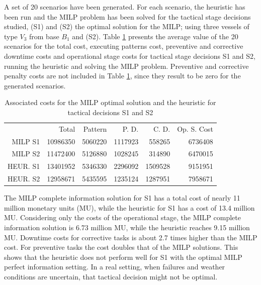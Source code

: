 A set of 20 scenarios have been generated. For each scenario, the heuristic has been run and the MILP problem has been solved for the tactical stage decisions studied, (S1) and (S2) the optimal solution for the MILP; using three vessels of type $V_3$ from base $B_1$ and (S2). Table \ref{tab:experiments} presents the average value of the 20 scenarios for the total cost, executing patterns cost, preventive and corrective downtime costs and operational stage costs for tactical stage decisions S1 and S2, running the heuristic and solving the MILP problem. Preventive and corrective penalty costs are not included in Table \ref{tab:experiments}, since they result to be zero for the generated scenarios.

\begin{table}[h]
	\centering
	\caption{Associated costs for the MILP optimal solution and the heuristic for tactical decisions S1 and S2}
	\label{tab:experiments}
\begin{tabular}{rrrrrr}
         & Total    & Pattern & P. D.   & C. D.   & Op. S. Cost \\
MILP S1  & 10986350 & 5060220 & 1117923 & 558265  & 6736408     \\
MILP S2  & 11472400 & 5126880 & 1028245 & 314890  & 6470015     \\
HEUR. S1 & 13401952 & 5346330 & 2296092 & 1509528 & 9151951     \\
HEUR. S2 & 12958671 & 5435595 & 1235124 & 1287951 & 7958671    
\end{tabular}
\end{table}

The MILP complete information solution for S1 has a total cost of nearly 11 million monetary units (MU), while the heuristic for S1 has a cost of 13.4 million MU. Considering only the costs of the operational stage, the MILP complete information solution is 6.73 million MU, while the heuristic reaches 9.15 million MU. %
Downtime costs for corrective tasks is about 2.7 times higher than the MILP cost. For preventive tasks the cost doubles that of the MILP solutions. This shows that the heuristic does not perform well for S1 with the optimal MILP perfect information setting. In a real setting, when failures and weather conditions are uncertain, that tactical decision might not be optimal.

